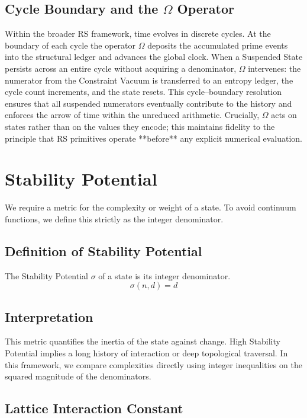 \documentclass[11pt, letterpaper]{article}
\newcommand{\sigmaOp}{\sigma}
\newcommand{\OmegaOp}{\Omega}
\begin{document}
\subsection{Cycle Boundary and the $\OmegaOp$ Operator}

Within the broader RS framework, time evolves in discrete cycles.  At the boundary of each cycle the operator $\OmegaOp$ deposits the accumulated prime events into the structural ledger and advances the global clock.  When a Suspended State persists across an entire cycle without acquiring a denominator, $\OmegaOp$ intervenes: the numerator from the Constraint Vacuum is transferred to an entropy ledger, the cycle count increments, and the state resets.  This cycle–boundary resolution ensures that all suspended numerators eventually contribute to the history and enforces the arrow of time within the unreduced arithmetic.  Crucially, $\OmegaOp$ acts on states rather than on the values they encode; this maintains fidelity to the principle that RS primitives operate **before** any explicit numerical evaluation.

\section{Stability Potential}

We require a metric for the complexity or weight of a state. To avoid continuum functions, we define this strictly as the integer denominator.

\subsection{Definition of Stability Potential}
The Stability Potential $\sigmaOp$ of a state is its integer denominator.
\[
\sigmaOp(n, d) = d
\]

\subsection{Interpretation}
This metric quantifies the inertia of the state against change. High Stability Potential implies a long history of interaction or deep topological traversal. In this framework, we compare complexities directly using integer inequalities on the squared magnitude of the denominators.

\subsection{Lattice Interaction Constant}\label{sec:stability}
\end{document}
